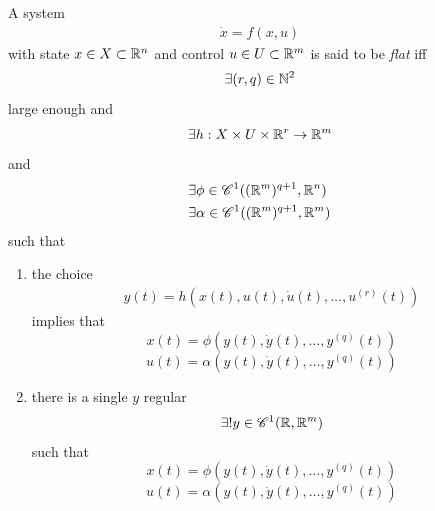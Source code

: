 \documentclass[12pt]{article}
\begin{document}
\begin{definition}\label{def:flatSystem}
  A system
  \begin{equation}\begin{aligned}\label{eqControlSystem}
    \dot{x} = f(x,u)
  \end{aligned}\end{equation}
  with state $x \in X \subset \mathbb{R}^n$ and control $u \in U \subset \mathbb{R}^m$ is said to be \emph{flat} iff
  \[ \exists (r,q) \in \mathbb{N}^2 \]
  large enough and
  \[ \exists h : X \times U \times \mathbb{R}^r \to \mathbb{R}^m  \]
  and
  \begin{equation}\begin{aligned}
    &\exists \phi \in \mathscr{C}^1((\mathbb{R}^m)^{q+1},\mathbb{R}^n) \\
    &\exists \alpha \in \mathscr{C}^1((\mathbb{R}^m)^{q+1},\mathbb{R}^m)
  \end{aligned}\end{equation}
  such that
  \begin{enumerate}
  
    \begin{equation}\begin{aligned}
      \forall x \in \COne(\R,X) \\
      \forall u \in \COne(\R,U) \\
    \end{aligned}\end{equation}
    which solve \eqref{eqControlSystem}
  
    \item \label{itm:defFlatOne} the choice
    \begin{equation}\begin{aligned}
    y(t) = h(x(t),u(t),\dot{u}(t),\ldots,u^{(r)}(t))
    \end{aligned}\end{equation}
    implies that
    \[ x(t) = \phi(y(t),\dot{y}(t),\ldots,y^{(q)}(t)) \]
    \[ u(t) = \alpha(y(t),\dot{y}(t),\ldots,y^{(q)}(t)) \]
    
    \item \label{itm:defFlatTwo} there is a single $y$ regular
    \begin{equation}\begin{aligned}
      \exists ! y \in \mathscr{C}^1(\mathbb{R}, \mathbb{R}^m)
    \end{aligned}\end{equation}
    such that
    \[ x(t) = \phi(y(t),\dot{y}(t),\ldots,y^{(q)}(t)) \]
    \[ u(t) = \alpha(y(t),\dot{y}(t),\ldots,y^{(q)}(t)) \]
  
  \end{enumerate}
  
\end{definition}
\end{document}
